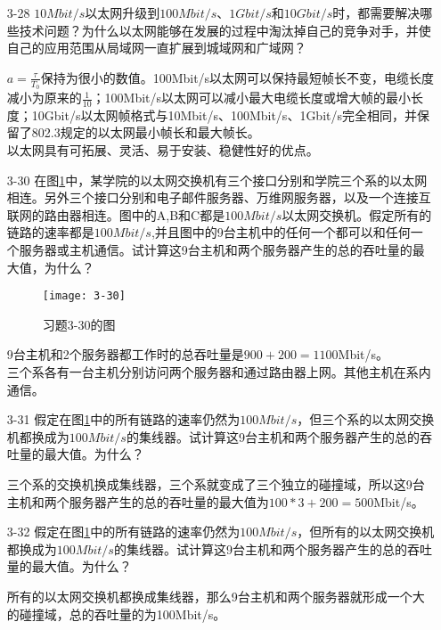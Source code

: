 \documentclass[a4paper,UTF8]{article}
\begin{document}
\begin{enumerate}
\item[3-28] $10Mbit/s$以太网升级到$100Mbit/s$、$1Gbit/s$和$10Gbit/s$时，都需要解决哪些技术问题？为什么以太网能够在发展的过程中淘汰掉自己的竞争对手，并使自己的应用范围从局域网一直扩展到城域网和广域网？
\begin{solution}
    $a=\frac{\tau}{T_0}$保持为很小的数值。100Mbit/s以太网可以保持最短帧长不变，电缆长度减小为原来的$\frac{1}{10}$；100Mbit/s以太网可以减小最大电缆长度或增大帧的最小长度；10Gbit/s以太网帧格式与10Mbit/s、100Mbit/s、1Gbit/s完全相同，并保留了802.3规定的以太网最小帧长和最大帧长。\\
    以太网具有可拓展、灵活、易于安装、稳健性好的优点。
\end{solution}

\item[3-30] 在图\ref{img:3-30}中，某学院的以太网交换机有三个接口分别和学院三个系的以太网相连。另外三个接口分别和电子邮件服务器、万维网服务器，以及一个连接互联网的路由器相连。图中的A,B和C都是$100Mbit/s$以太网交换机。假定所有的链路的速率都是$100Mbit/s$,并且图中的9台主机中的任何一个都可以和任何一个服务器或主机通信。试计算这9台主机和两个服务器产生的总的吞吐量的最大值，为什么？ 
\begin{figure}[htbp]
    \centering
    \texttt{[image: 3-30]}
    \caption{习题3-30的图}
    \label{img:3-30}
\end{figure}
\begin{solution}
    9台主机和2个服务器都工作时的总吞吐量是$900+200=1100$Mbit/s。\\
    三个系各有一台主机分别访问两个服务器和通过路由器上网。其他主机在系内通信。
\end{solution}

\item[3-31] 假定在图\ref{img:3-30}中的所有链路的速率仍然为$100Mbit/s$，但三个系的以太网交换机都换成为$100Mbit/s$的集线器。试计算这9台主机和两个服务器产生的总的吞吐量的最大值。为什么？
\begin{solution}
    三个系的交换机换成集线器，三个系就变成了三个独立的碰撞域，所以这9台主机和两个服务器产生的总的吞吐量的最大值为$100*3+200=500$Mbit/s。
\end{solution}

\item[3-32] 假定在图\ref{img:3-30}中的所有链路的速率仍然为$100Mbit/s$，但所有的以太网交换机都换成为$100Mbit/s$的集线器。试计算这9台主机和两个服务器产生的总的吞吐量的最大值。为什么？ 
\begin{solution}
    所有的以太网交换机都换成集线器，那么9台主机和两个服务器就形成一个大的碰撞域，总的吞吐量的为100Mbit/s。
\end{solution}


\end{enumerate}
\end{document}

